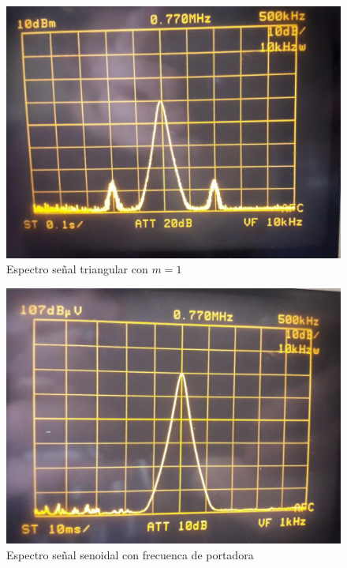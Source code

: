 \begin{figure}[H]
    \centering
    \includegraphics[scale=0.3]{Recursos/Ej3_triangular_m1.jpeg}
    \caption{Espectro señal triangular con $m = 1$}
\end{figure}\label{fig:triangular_ej3}

\begin{figure}[H]
    \centering
    \includegraphics[scale=0.3]{Recursos/Ej3_senoidal_800K.jpeg}
    \caption{Espectro señal senoidal con frecuenca de portadora}
\end{figure}

